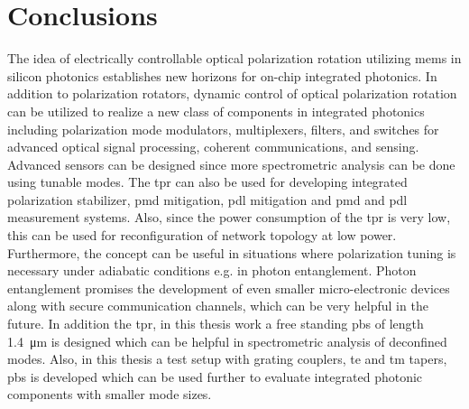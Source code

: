 \documentclass[../report.tex]{subfiles}
\begin{document}
		
\chapter{Conclusions}

The idea of electrically controllable optical polarization rotation utilizing \gls{mems} in silicon photonics establishes new horizons for on-chip integrated photonics. In addition to polarization rotators, dynamic control of optical polarization rotation can be utilized to realize a new class of components in integrated photonics including polarization mode modulators, multiplexers, filters, and switches for advanced optical signal processing, coherent communications, and sensing. Advanced sensors can be designed since more spectrometric analysis can be done using tunable modes. The \gls{tpr} can also be used for developing integrated polarization stabilizer, \gls{pmd} mitigation, \gls{pdl} mitigation and \gls{pmd} and \gls{pdl} measurement systems. Also, since the power consumption of the \gls{tpr} is very low, this can be used for reconfiguration of network topology at low power. Furthermore, the concept can be useful in situations where polarization tuning is necessary under adiabatic conditions e.g. in photon entanglement. Photon entanglement promises  the development of even smaller micro-electronic devices along with secure communication channels, which can be very helpful in the future. In addition the \gls{tpr}, in this thesis work a free standing \gls{pbs} of length \SI{1.4}{\micro \meter} is designed which can be helpful in spectrometric analysis of deconfined modes. Also, in this thesis a test setup with grating couplers, \gls{te} and \gls{tm} tapers, \gls{pbs} is developed which can be used further to evaluate integrated photonic components with smaller mode sizes.
\end{document}
